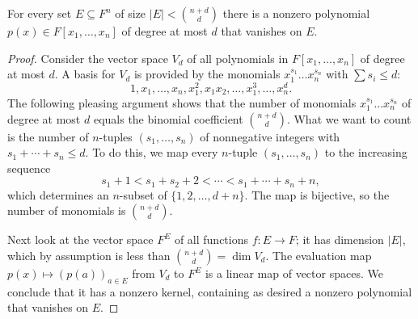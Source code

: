 \begin{lemma}
  \label{ch35lemma2}
For every set $E \subseteq F^n$ of size $|E| < \binom{n+d}{d}$ there is a nonzero
polynomial $p(x) \in F[x_1, \dots, x_n]$ of degree at most $d$ that vanishes on $E$.
\end{lemma}
\begin{proof}
Consider the vector space $V_d$ of all polynomials in $F[x_1, \dots, x_n]$ of degree at most $d$.
A basis for $V_d$ is provided by the monomials $x_1^{s_1} \dots x_n^{s_n}$ with $\sum s_i \leq d$:
\[
1, x_1, \dots, x_n, x_1^2, x_1 x_2, \dots, x_1^3, \dots, x_n^d.
\]
The following pleasing argument shows that the number of monomials $x_1^{s_1} \dots x_n^{s_n}$ of
degree at most $d$ equals the binomial coefficient $\binom{n+d}{d}$. What we want to count is
the number of $n$-tuples $(s_1, \dots, s_n)$ of nonnegative integers with
$s_1 + \cdots + s_n \leq d$. To do this, we map every $n$-tuple $(s_1, \dots, s_n)$ to the
increasing sequence
\[
s_1 + 1 < s_1 + s_2 + 2 < \cdots < s_1 + \cdots + s_n + n,
\]
which determines an $n$-subset of $\{1, 2, \dots, d + n\}$. The map is bijective, so the number of
 monomials is $\binom{n+d}{d}$.

Next look at the vector space $F^E$ of all functions $f : E \to F$; it has dimension $|E|$,
which by assumption is less than $\binom{n+d}{d} = \dim V_d$. The evaluation
map $p(x) \mapsto (p(a))_{a \in E}$ from $V_d$ to $F^E$ is a linear map of vector spaces.
We conclude that it has a nonzero kernel,
containing as desired a nonzero polynomial that vanishes on $E$.
\end{proof}


